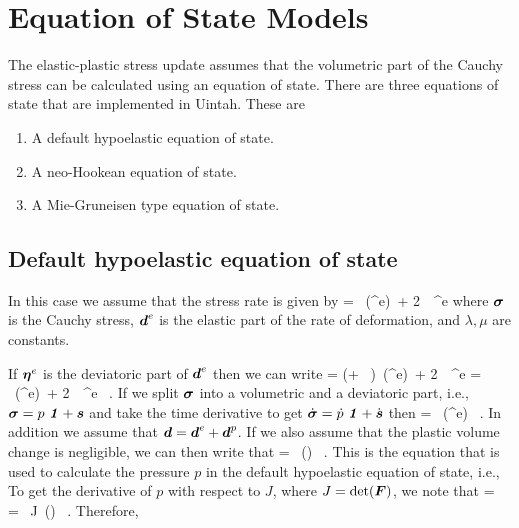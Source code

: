 \section{Equation of State Models}
The elastic-plastic stress update assumes that the volumetric part of the 
Cauchy stress can be calculated using an equation of state.  There are 
three equations of state that are implemented in Uintah.  These are
\begin{enumerate}
    \item A default hypoelastic equation of state.
    \item A neo-Hookean equation of state.    
    \item A Mie-Gruneisen type equation of state.
\end{enumerate}

\subsection{Default hypoelastic equation of state}
In this case we assume that the stress rate is given by
\Beq
    \dot{\Bsig} = \lambda~\Tr(\Bd^e)~\Bone + 2~\mu~\Bd^e
\Eeq
where $\Bsig$ is the Cauchy stress, $\Bd^e$ is the elastic part of
the rate of deformation, and $\lambda, \mu$ are constants.

If $\Beta^e$ is the deviatoric part of $\Bd^e$ then we can write
\Beq
    \dot{\Bsig} = \left(\lambda + ~\mu\right)~\Tr(\Bd^e)~\Bone + 
        2~\mu~\Beta^e = \kappa~\Tr(\Bd^e)~\Bone + 2~\mu~\Beta^e ~.
\Eeq
If we split $\Bsig$ into a volumetric and a deviatoric part, i.e.,
$\Bsig = p~\Bone + \Bs$ and take the time derivative to get
$\dot{\Bsig} = \dot{p}~\Bone + \dot{\Bs}$ then
\Beq
     = \kappa~\Tr(\Bd^e) ~.
\Eeq
In addition we assume that $\Bd = \Bd^e + \Bd^p$.  If we also assume that 
the plastic volume change is negligible, we can then write that
\Beq
     = \kappa~\Tr(\Bd) ~.
\Eeq
This is the equation that is used to calculate the pressure $p$ in the 
default hypoelastic equation of state, i.e.,
\Beq
\Eeq
To get the derivative of $p$ with respect to $J$, where $J = \det(\BF)$,
we note that
\Beq
     = ~ = ~J~\Tr(\Bd) ~.
\Eeq
Therefore,
\Beq
\Eeq

